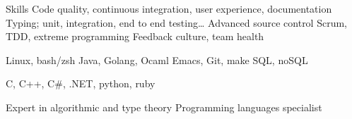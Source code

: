 \begin{rubric}{\color{ForestGreen} Skills}
  \entry*[Quality] Code quality, continuous integration, user experience, documentation
  \entry*[Testing] Typing; unit, integration, end to end testing\ldots
  \entry* Advanced source control
  \entry*[Agile] Scrum, TDD, extreme programming
  \entry*[Human] Feedback culture, team health

  \entry*[Expert] Linux, bash/zsh
  \entry* Java, Golang, Ocaml
  \entry* Emacs, Git, make
  \entry* SQL, noSQL

  \entry*[Mastered] C, C++, C$\#$, .NET, python, ruby

  \entry*
  Expert in algorithmic and type theory
  \entry*
  Programming languages specialist

\end{rubric}
